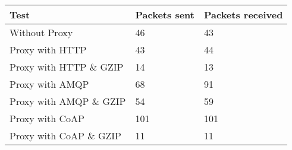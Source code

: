 \begin{tabular}{|l|l|l|}
\hline
\textbf{Test} & \textbf{Packets sent} & \textbf{Packets received} \\ \hline
Without Proxy                    &46         & 43        \\ \hline 
Proxy with HTTP                  &43         & 44        \\ \hline 
Proxy with HTTP \& GZIP          &14         & 13        \\ \hline 
Proxy with AMQP                  &68         & 91        \\ \hline 
Proxy with AMQP \& GZIP          &54         & 59        \\ \hline 
Proxy with CoAP                  &101        & 101       \\ \hline 
Proxy with CoAP \& GZIP          &11         & 11        \\ \hline 
\end{tabular}